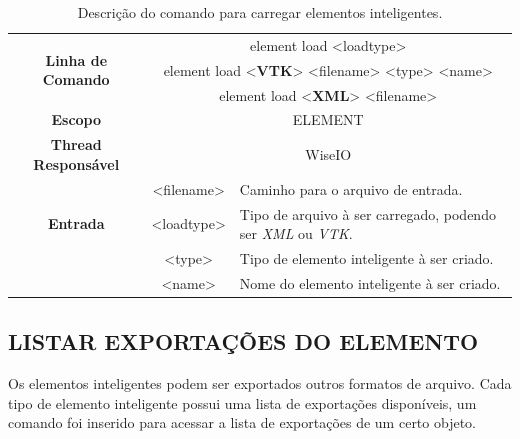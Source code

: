 \begin{center}
	\begin{table}[!htbp]
		\begin{tabularx}{\textwidth}{c|c|X}
			\toprule
			\multirow{3}{*}{\textbf{Linha de Comando}} & \multicolumn{2}{c}{element load <load\underline{\space\space}type>} \\
			& \multicolumn{2}{c}{element load <\textbf{VTK}> <filename> <type> <name>} \\
			& \multicolumn{2}{c}{element load <\textbf{XML}> <filename>} \\
			\midrule
			\textbf{Escopo} & \multicolumn{2}{c}{ELEMENT} \\
			\hline
			\textbf{Thread Responsável} & \multicolumn{2}{c}{WiseIO} \\
			\hline
			\multirow{3}{*}{\textbf{Entrada}} & <filename> & Caminho para o arquivo de entrada. \\
			& <load\underline{\space\space}type> & Tipo de arquivo à ser carregado, podendo ser \textit{XML} ou \textit{VTK}. \\
			& <type> & Tipo de elemento inteligente à ser criado. \\
			& <name> & Nome do elemento inteligente à ser criado. \\
			\bottomrule
		\end{tabularx}
		\caption{Descrição do comando para carregar elementos inteligentes.}
		\label{tab:load_element}
	\end{table}
\end{center}

\subsection{LISTAR EXPORTAÇÕES DO ELEMENTO}\label{sec:export_list_element}

Os elementos inteligentes podem ser exportados outros formatos de arquivo. Cada tipo de elemento inteligente possui uma lista de exportações disponíveis, um comando foi inserido para acessar a lista de exportações de um certo objeto.

